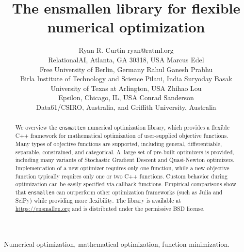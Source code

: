 \documentclass[twoside,11pt]{article}
\begin{document}
\title{The ensmallen library for flexible numerical optimization}

\author{\name Ryan R. Curtin \email ryan@ratml.org \\
       \addr RelationalAI, Atlanta, GA 30318, USA
       \AND
       \name Marcus Edel\\
       \addr Free University of Berlin, Germany
       \AND
       \name Rahul Ganesh Prabhu \\
       \addr Birla Institute of Technology and Science Pilani, India
       \AND
       \name Suryoday Basak \\
       \addr University of Texas at Arlington, USA
       \AND
       \name Zhihao Lou \\
       \addr Epsilon, Chicago, IL, USA
       \AND
       \name Conrad Sanderson \\
       \addr Data61/CSIRO, Australia, and Griffith University, Australia}


\maketitle

\begin{abstract}%
We overview the {\tt ensmallen} numerical optimization library,
which provides a flexible C++ framework
for mathematical optimization of user-supplied objective functions.
Many types of objective functions are supported,
including general, differentiable, separable, constrained, and categorical.
A~large set of pre-built optimizers is provided,
including many variants of Stochastic Gradient Descent and Quasi-Newton optimizers.
Implementation of a new optimizer requires only one function,
while a new objective function typically requires only one or two C++ functions.
Custom behavior during optimization can be easily specified via callback functions.
Empirical comparisons show that {\tt ensmallen}
can outperform other optimization frameworks (such as Julia and SciPy)
while providing more flexibility.
The library is available at \url{https://ensmallen.org}
and is distributed under the permissive BSD license.

\end{abstract}

\begin{keywords}
  Numerical optimization, mathematical optimization, function minimization.
\end{keywords}
\end{document}
